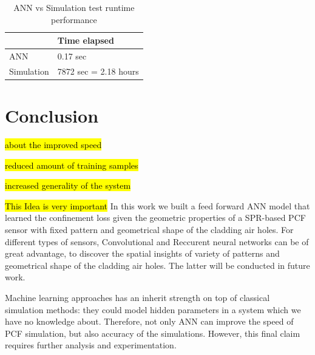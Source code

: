 \documentclass[draft, 10pt]{IEEEtran}
\begin{document}
\begin{table}[h]
\centering
\begin{tabular}{l|l}
      & Time elapsed \\
      \hline
    ANN &  0.17 sec \\
    \hline
    Simulation &  7872 sec = 2.18 hours  \\
\end{tabular}

\caption{ANN vs Simulation test runtime performance}
\end{table}
\newpage

\section{Conclusion}
\label{sec:conc}

\hl{about the improved speed}

\hl{reduced amount of training samples}

\hl{increased generality of the system}

\hl{This Idea is very important}
In this work we built a feed forward ANN model that learned the confinement loss given the geometric properties of a SPR-based PCF sensor with fixed pattern and geometrical shape of the cladding air holes. For different types of sensors, Convolutional and Reccurent neural networks can be of great advantage, to discover the spatial insights of variety of patterns and  geometrical shape of the cladding air holes. The latter will be conducted in future work.

Machine learning approaches has an inherit strength on top of classical simulation methods: they could model hidden parameters in a system which we have no knowledge about. Therefore, not only ANN can improve the speed of PCF simulation, but also accuracy of the simulations. However, this final claim requires further analysis and experimentation.


	
\end{document}

